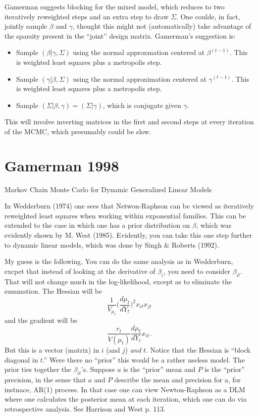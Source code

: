 \documentclass{article}
\begin{document}
Gamerman suggests blocking for the mixed model, which reduces to two iteratively
reweighted steps and an extra step to draw $\Sigma$.  One coulde, in fact,
jointly sample $\beta$ and $\gamma$, thought this might not (automatically) take
advantage of the sparsity present in the ``joint'' design matrix.  Gamerman's
suggestion is:
\begin{itemize}
\item Sample $(\beta | \gamma, \Sigma)$ using the normal approxmation centered
  at $\beta^{(t-1)}$.  This is weighted least squares plus a metropolis step.
\item Sample $(\gamma | \beta, \Sigma)$ using the normal approximation centered
  at $\gamma^{(t-1)}$.  This is weighted least squares plus a metropolis step.
\item Sample $(\Sigma | \beta, \gamma) = (\Sigma | \gamma)$, which is conjugate
  given $\gamma$.
\end{itemize}
This will involve inverting matrices in the first and second steps at every
iteration of the MCMC, which presumably could be slow.

\section{Gamerman 1998}

Markov Chain Monte Carlo for Dynamic Generalized Linear Models

In Wedderburn (1974) one sees that Netwon-Raphson can be viewed as iteratively
reweighted least squares when working within exponential families.  This can be
extended to the case in which one has a prior distribution on $\beta$, which was
evidently shown by M. West (1985).  Evidently, you can take this one step
further to dynamic linear models, which was done by Singh \& Roberts (1992).

My guess is the following.  You can do the same analysis as in Wedderburn,
excpet that instead of looking at the derivative of $\beta_i$, you need to
consider $\beta_{it}$.  That will not change much in the log-likelihood, except
as to eliminate the summation.  The Hessian will be
\[
\frac{1}{V_{\mu_t}} \Big( \frac{d\mu_t}{d Y_t} \Big)^2 x_{it} x_{jt} 
\]
and the gradient will be
\[
\frac{r_t}{V(\mu_t)} \frac{d \mu_t}{d Y_t} x_{it}.
\]
But this is a vector (matrix) in $i$ (and $j$) \emph{and} $t$.  Notice that the
Hessian is ``block diagonal in $t$.''  Were there no ``prior'' this would be a
rather useless model.  The prior ties together the $\beta_{it}$'s.  Suppose $a$
is the ``prior'' mean and $P$ is the ``prior'' precision, in the sense that $a$
and $P$ describe the mean and precision for a, for instnace, AR(1) process.  In
that case one can view Newton-Raphson as a DLM where one calculates the
posterior mean at each iteration, which one can do via retrospective analysis.
See Harrison and West p. 113.
\end{document}
